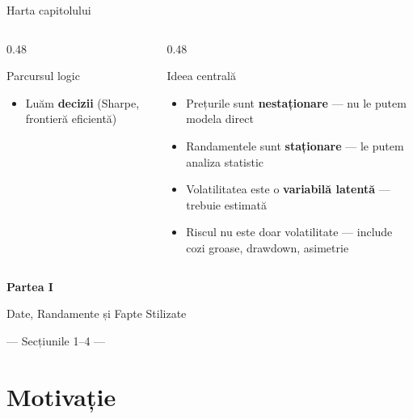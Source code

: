 \documentclass[9pt, aspectratio=169, t]{beamer}
\theoremstyle{definition}
\begin{document}
\begin{frame}{Harta capitolului}
\begin{columns}[T]
\begin{column}{0.48\textwidth}
\begin{block}{Parcursul logic}
\begin{itemize}
    \item Luăm \textbf{decizii} (Sharpe, frontieră eficientă)
\end{itemize}
\end{block}
\end{column}
\begin{column}{0.48\textwidth}
\begin{exampleblock}{Ideea centrală}
\begin{itemize}
    \item Prețurile sunt \textbf{nestaționare} --- nu le putem modela direct
    \item Randamentele sunt \textbf{staționare} --- le putem analiza statistic
    \item Volatilitatea este o \textbf{variabilă latentă} --- trebuie estimată
    \item Riscul nu este doar volatilitate --- include cozi groase, drawdown, asimetrie
\end{itemize}
\end{exampleblock}
\end{column}
\end{columns}
\end{frame}

{
\begin{frame}[plain]
\vfill
\begin{center}
{\Huge\textcolor{IDAred}{\textbf{Partea I}}}

\vspace{0.6cm}

{\Large\textcolor{MainBlue}{Date, Randamente și Fapte Stilizate}}

\vspace{0.4cm}

{\large\textcolor{MediumGray}{--- Secțiunile 1--4 ---}}
\end{center}
\vfill
\end{frame}
}

\section{Motivație}
\end{document}

